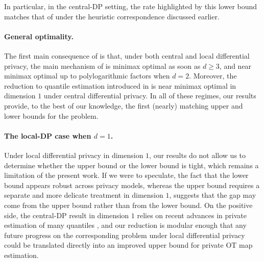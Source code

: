 \documentclass{article}
\newcommand{\1}{\mathds{1}}
\theoremstyle{plain}
\theoremstyle{definition}
\theoremstyle{remark}
\begin{document}
In particular, in the central-DP setting, the rate highlighted by this lower bound matches that of \cite{lalanne2025PrivateOTMaps} under the heuristic correspondence discussed earlier.

\paragraph{General optimality.}
The first main consequence of  is that, under both central and local differential privacy, the main mechanism of  is minimax optimal as soon as $d \geq 3$, and near minimax optimal up to polylogarithmic factors when $d=2$. Moreover, the reduction to quantile estimation introduced in  is near minimax optimal in dimension $1$ under central differential privacy. In all of these regimes, our results provide, to the best of our knowledge, the first (nearly) matching upper and lower bounds for the problem.

\paragraph{The local-DP case when $d=1$.}
Under local differential privacy in dimension $1$, our results do not allow us to determine whether the upper bound or the lower bound is tight, which remains a limitation of the present work. If we were to speculate, the fact that the lower bound appears robust across privacy models, whereas the upper bound requires a separate and more delicate treatment in dimension $1$, suggests that the gap may come from the upper bound rather than from the lower bound. On the positive side, the central-DP result in dimension $1$ relies on recent advances in private estimation of many quantiles \cite{gillenwater2021differentially,kaplan2022differentially}, and our reduction is modular enough that any future progress on the corresponding problem under local differential privacy could be translated directly into an improved upper bound for private OT map estimation.
\end{document}

